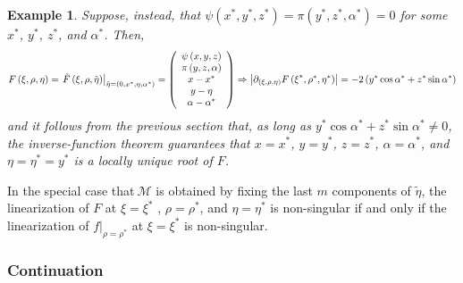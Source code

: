\documentclass{article}
\newtheorem{example}[theorem]{Example}
\begin{document}
\begin{example}
Suppose, instead, that $\psi \left( x^{\ast },y^{\ast },z^{\ast }\right)
=\pi \left( y^{\ast },z^{\ast },\alpha ^{\ast }\right) =0$ for some $x^{\ast
}$, $y^{\ast }$, $z^{\ast }$, and $\alpha ^{\ast }$. Then,%
\[
F\left( \xi ,\rho ,\eta \right) =\left. \tilde{F}\left( \xi ,\rho ,\tilde{%
\eta}\right) \right| _{\tilde{\eta}=\left( 0,x^{\ast },\eta ,\alpha ^{\ast
}\right) }=\left( 
\begin{array}{c}
\psi \left( x,y,z\right)  \\ 
\pi \left( y,z,\alpha \right)  \\ 
x-x^{\ast } \\ 
y-\eta  \\ 
\alpha -\alpha ^{\ast }%
\end{array}%
\right) \Rightarrow \left| \partial _{\left( \xi ,\rho ,\eta \right)
}F\left( \xi ^{\ast },\rho ^{\ast },\eta ^{\ast }\right) \right| =-2\left(
y^{\ast }\cos \alpha ^{\ast }+z^{\ast }\sin \alpha ^{\ast }\right) 
\]%
and it follows from the previous section that, as long as $y^{\ast }\cos
\alpha ^{\ast }+z^{\ast }\sin \alpha ^{\ast }\neq 0$, the inverse-function
theorem guarantees that $x=x^{\ast }$, $y=y^{\ast }$, $z=z^{\ast }$, $\alpha
=\alpha ^{\ast }$, and $\eta =\eta ^{\ast }=y^{\ast }$ is a locally unique
root of $F$.
\end{example}

In the special case that$\ \mathcal{M}$ is obtained by fixing the last $m$
components of $\tilde{\eta}$, the linearization of $F$ at $\xi =\xi ^{\ast }$%
, $\rho =\rho ^{\ast }$, and $\eta =\eta ^{\ast }$ is non-singular if and
only if the linearization of $\left. f\right| _{\rho =\rho ^{\ast }}$ at $%
\xi =\xi ^{\ast }$ is non-singular.

\subsubsection{Continuation}
\end{document}
